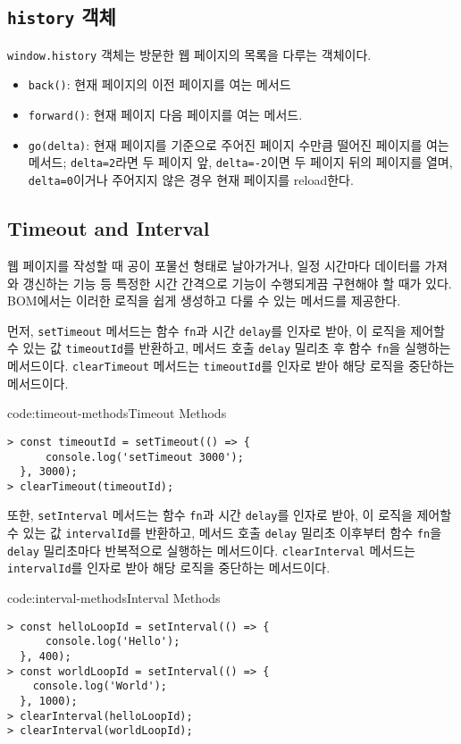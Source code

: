 \subsection*{\texttt{history} 객체}

\texttt{window.history} 객체는 방문한 웹 페이지의 목록을 다루는 객체이다.

\begin{itemize}
    \item \texttt{back()}: 현재 페이지의 이전 페이지를 여는 메서드
    \item \texttt{forward()}: 현재 페이지 다음 페이지를 여는 메서드.
    \item \texttt{go(delta)}: 현재 페이지를 기준으로 주어진 페이지 수만큼 떨어진 페이지를 여는 메서드; \texttt{delta=2}라면 두 페이지 앞, \texttt{delta=-2}이면 두 페이지 뒤의 페이지를 열며, \texttt{delta=0}이거나 주어지지 않은 경우 현재 페이지를 reload한다.
\end{itemize}

\subsection*{Timeout and Interval}

웹 페이지를 작성할 때 공이 포물선 형태로 날아가거나, 일정 시간마다 데이터를 가져와 갱신하는 기능 등 특정한 시간 간격으로 기능이 수행되게끔 구현해야 할 때가 있다. BOM에서는 이러한 로직을 쉽게 생성하고 다룰 수 있는 메서드를 제공한다.

먼저, \texttt{setTimeout} 메서드는 함수 \texttt{fn}과 시간 \texttt{delay}를 인자로 받아, 이 로직을 제어할 수 있는 값 \texttt{timeoutId}를 반환하고, 메서드 호출 \texttt{delay} 밀리초 후 함수 \texttt{fn}을 실행하는 메서드이다. \texttt{clearTimeout} 메서드는 \texttt{timeoutId}를 인자로 받아 해당 로직을 중단하는 메서드이다.

\begin{codeenv}{code:timeout-methods}{Timeout Methods}\begin{verbatim}
> const timeoutId = setTimeout(() => {
      console.log('setTimeout 3000');
  }, 3000);
> clearTimeout(timeoutId);
\end{verbatim}
\end{codeenv}

또한, \texttt{setInterval} 메서드는 함수 \texttt{fn}과 시간 \texttt{delay}를 인자로 받아, 이 로직을 제어할 수 있는 값 \texttt{intervalId}를 반환하고, 메서드 호출 \texttt{delay} 밀리초 이후부터 함수 \texttt{fn}을 \texttt{delay} 밀리초마다 반복적으로 실행하는 메서드이다. \texttt{clearInterval} 메서드는 \texttt{intervalId}를 인자로 받아 해당 로직을 중단하는 메서드이다.

\begin{codeenv}{code:interval-methods}{Interval Methods}\begin{verbatim}
> const helloLoopId = setInterval(() => {
      console.log('Hello');
  }, 400);
> const worldLoopId = setInterval(() => {
    console.log('World');
  }, 1000);
> clearInterval(helloLoopId);
> clearInterval(worldLoopId);
\end{verbatim}
\end{codeenv}

